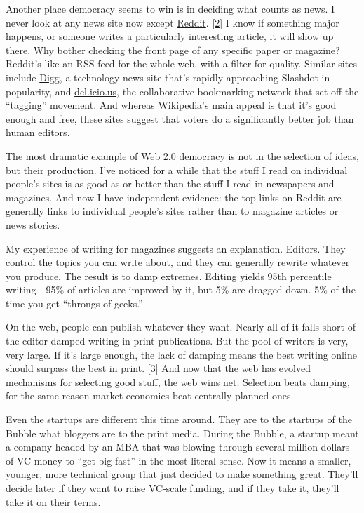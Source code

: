 Another place democracy seems to win is in deciding what counts as news.
I never look at any news site now except
\href{http://reddit.com}{Reddit}. {[}\hyperref[f2n]{2}{]} I know if
something major happens, or someone writes a particularly interesting
article, it will show up there. Why bother checking the front page of
any specific paper or magazine? Reddit's like an RSS feed for the whole
web, with a filter for quality. Similar sites include
\href{http://digg.com}{Digg}, a technology news site that's rapidly
approaching Slashdot in popularity, and
\href{http://del.icio.us}{del.icio.us}, the collaborative bookmarking
network that set off the ``tagging'' movement. And whereas Wikipedia's
main appeal is that it's good enough and free, these sites suggest that
voters do a significantly better job than human editors.

The most dramatic example of Web 2.0 democracy is not in the selection
of ideas, but their production. I've noticed for a while that the stuff
I read on individual people's sites is as good as or better than the
stuff I read in newspapers and magazines. And now I have independent
evidence: the top links on Reddit are generally links to individual
people's sites rather than to magazine articles or news stories.

My experience of writing for magazines suggests an explanation. Editors.
They control the topics you can write about, and they can generally
rewrite whatever you produce. The result is to damp extremes. Editing
yields 95th percentile writing---95\% of articles are improved by it,
but 5\% are dragged down. 5\% of the time you get ``throngs of geeks.''

On the web, people can publish whatever they want. Nearly all of it
falls short of the editor-damped writing in print publications. But the
pool of writers is very, very large. If it's large enough, the lack of
damping means the best writing online should surpass the best in print.
{[}\hyperref[f3n]{3}{]} And now that the web has evolved mechanisms for
selecting good stuff, the web wins net. Selection beats damping, for the
same reason market economies beat centrally planned ones.

Even the startups are different this time around. They are to the
startups of the Bubble what bloggers are to the print media. During the
Bubble, a startup meant a company headed by an MBA that was blowing
through several million dollars of VC money to ``get big fast'' in the
most literal sense. Now it means a smaller, \href{hiring.html}{younger},
more technical group that just decided to make something great. They'll
decide later if they want to raise VC-scale funding, and if they take
it, they'll take it on \href{vcsqueeze.html}{their terms}.

